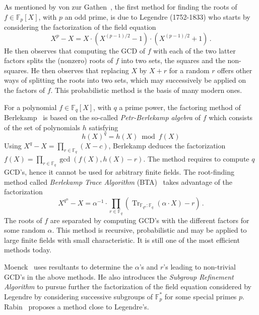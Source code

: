 \documentclass{sig-alternate}
\newcommand{\ff}[1]{\mathbb{F}_{#1}}
\newcommand{\qq}{q}
\newcommand{\basef}{\ff{\qq}}
\DeclareMathOperator{\Tr}{Tr}
\newcommand{\tr}[2]{\Tr_{\ff{#1}:\ff{#2}}}
\renewcommand{\paragraph}[1]{\smallskip\noindent{{\bf \rm #1.}}}
\begin{document}
\paragraph{Previous work} %
%
As mentioned by von zur Gathen~\cite{Gathen06}, the first method for finding the roots of $f \in \mathbb{F}_p[X]$, with $p$ an odd prime, is due to Legendre (1752-1833) who starts by considering the factorization of the field equation
$$X^{p}-X=X \cdot (X^{(p-1)/2}-1) \cdot (X^{(p-1)/2}+1)\,.$$
He then observes that computing the GCD of $f$ with each of the two latter factors splits the (nonzero) roots of $f$ into two sets, the squares and the non-squares. He then observes that replacing $X$ by $X+r$ for a random $r$  offers other ways of splitting the roots into two sets, which may successively be applied on the factors of $f$. This probabilistic method is the basis of many modern ones.


For a polynomial $f \in  \mathbb{F}_\qq[X]$, with $\qq$ a prime power, the factoring method of Berlekamp~\cite{berl67} is based on the so-called \emph{Petr-Berlekamp algebra} of $f$ which consists of the set of polynomials $h$ satisfying  
$$h(X)^q=h(X) \bmod{f(X)}$$
Using 
$X^{\qq}-X=\prod_{r\in \basef}(X-c)$,
Berlekamp deduces the factorization $f(X)=\prod_{r \in \mathbb{F}_{\qq}} \gcd(f(X),h(X)-r)$. The method %
requires to compute $\qq$ GCD's, hence it cannot be used for arbitrary finite fields. The root-finding method called \emph{Berlekamp Trace Algorithm} (BTA)~\cite{berl70} takes advantage of the factorization 
$$X^{\qq^n}-X=\alpha^{-1} \cdot \prod_{r \in \basef}(\tr{\qq^n}{\qq}(\alpha \cdot X)-r)\,.$$
The roots of $f$ are separated by computing GCD's with the different factors for some random $\alpha$. This method is recursive, probabilistic and may be applied to large finite fields with small characteristic. It is still one of the most efficient methods today.

Moenck~\cite{Moenck77} uses resultants to determine the $\alpha$'s and $r$'s leading to non-trivial GCD's in the above methods. He also introduces the \emph{Subgroup Refinement Algorithm} to pursue further the factorization of the field equation considered by Legendre by considering successive subgroups of $\mathbb{F}_{p}^\ast$ for some special primes $p$.
Rabin~\cite{Rabin79} proposes a method close to Legendre's. 
\end{document}
